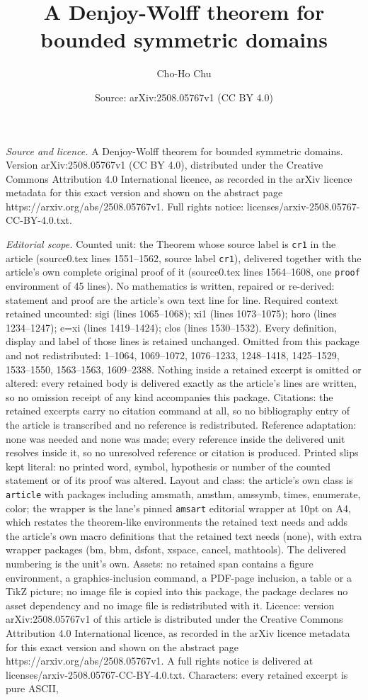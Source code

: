 \documentclass[10pt,a4paper]{amsart}
\title[A Denjoy-Wolff theorem for bounded symmetric domains]{A Denjoy-Wolff theorem for bounded symmetric domains}
\author{Cho-Ho Chu}
\date{Source: arXiv:2508.05767v1 (CC BY 4.0)}
\begin{document}
\maketitle

\noindent\emph{Source and licence.} A Denjoy-Wolff theorem for bounded symmetric domains. Version arXiv:2508.05767v1 (CC BY 4.0), distributed under the Creative Commons Attribution 4.0 International licence, as recorded in the arXiv licence metadata for this exact version and shown on the abstract page https://arxiv.org/abs/2508.05767v1. Full rights notice: licenses/arxiv-2508.05767-CC-BY-4.0.txt.\par\smallskip

\noindent\textit{Editorial scope.} Counted unit: the Theorem whose source label is \texttt{cr1} in the article (source0.tex lines 1551--1562, source label \texttt{cr1}), delivered together with the article's own complete original proof of it (source0.tex lines 1564--1608, one \texttt{proof} environment of 45 lines). No mathematics is written, repaired or re-derived: statement and proof are the article's own text line for line. Required context retained uncounted: sigi (lines 1065--1068); xi1 (lines 1073--1075); horo (lines 1234--1247); e=xi (lines 1419--1424); clos (lines 1530--1532). Every definition, display and label of those lines is retained unchanged. Omitted from this package and not redistributed: 1--1064, 1069--1072, 1076--1233, 1248--1418, 1425--1529, 1533--1550, 1563--1563, 1609--2388. Nothing inside a retained excerpt is omitted or altered: every retained body is delivered exactly as the article's lines are written, so no omission receipt of any kind accompanies this package. Citations: the retained excerpts carry no citation command at all, so no bibliography entry of the article is transcribed and no reference is redistributed. Reference adaptation: none was needed and none was made; every reference inside the delivered unit resolves inside it, so no unresolved reference or citation is produced. Printed slips kept literal: no printed word, symbol, hypothesis or number of the counted statement or of its proof was altered. Layout and class: the article's own class is \texttt{article} with packages including amsmath, amsthm, amssymb, times, enumerate, color; the wrapper is the lane's pinned \texttt{amsart} editorial wrapper at 10pt on A4, which restates the theorem-like environments the retained text needs and adds the article's own macro definitions that the retained text needs (none), with extra wrapper packages (bm, bbm, dsfont, xspace, cancel, mathtools). The delivered numbering is the unit's own. Assets: no retained span contains a figure environment, a graphics-inclusion command, a PDF-page inclusion, a table or a TikZ picture; no image file is copied into this package, the package declares no asset dependency and no image file is redistributed with it. Licence: version arXiv:2508.05767v1 of this article is distributed under the Creative Commons Attribution 4.0 International licence, as recorded in the arXiv licence metadata for this exact version and shown on the abstract page https://arxiv.org/abs/2508.05767v1. A full rights notice is delivered at licenses/arxiv-2508.05767-CC-BY-4.0.txt. Characters: every retained excerpt is pure ASCII, 
\end{document}
